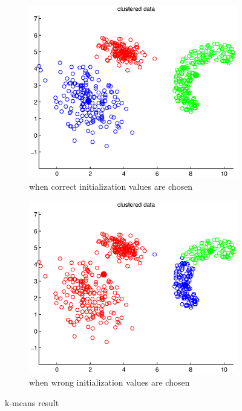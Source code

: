 \documentclass[12pt]{article}
\begin{document}
	\begin{figure}[htpb]
		\begin{subfigure}{.5\textwidth}
			\centering
			\includegraphics[width=.9\linewidth]{k-means_1}
			\caption{when correct initialization values are chosen}
			\label{fig:k-means_1}
		\end{subfigure}%
		\begin{subfigure}{.5\textwidth}
			\centering
			\includegraphics[width=.9\linewidth]{k-means_2}
			\caption{when wrong initialization values are chosen}
			\label{fig:k-means_2}
		\end{subfigure}
		\caption{k-means result}
		\label{fig:fig}
	\end{figure}
\end{document}
